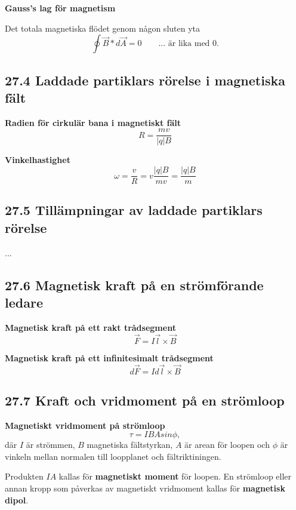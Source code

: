 \documentclass[a4paper]{article}
\begin{document}
\textbf{Gauss's lag för magnetism}

Det totala magnetiska flödet genom någon sluten yta 
\begin{equation}
\oint \vec{B}*d \vec{A} = 0 \qquad \text{... är lika med 0.}
\end{equation}

\subsection*{27.4 Laddade partiklars rörelse i magnetiska fält}
\textbf{Radien för cirkulär bana i magnetiskt fält}
\begin{equation}
R = \dfrac{mv}{|q|B}
\end{equation}

\textbf{Vinkelhastighet}
\begin{equation}
\omega = \dfrac{v}{R} = v \dfrac{|q|B}{mv} = \dfrac{|q|B}{m}
\end{equation}

\subsection*{27.5 Tillämpningar av laddade partiklars rörelse}
...

\subsection*{27.6 Magnetisk kraft på en strömförande ledare}
\textbf{Magnetisk kraft på ett rakt trådsegment}
\begin{equation}
\vec{F} = I \vec{l} \times \vec{B}
\end{equation}

\textbf{Magnetisk kraft på ett infinitesimalt trådsegment}
\begin{equation}
d \vec{F} = I d \vec{l} \times \vec{B}
\end{equation}

\subsection*{27.7 Kraft och vridmoment på en strömloop}

\textbf{Magnetiskt vridmoment på strömloop}
\begin{equation}
\tau = IBAsin\phi,
\end{equation}
där $I$ är strömmen, $B$ magnetiska fältstyrkan, $A$ är arean för loopen och $\phi$ är vinkeln mellan normalen till loopplanet och fältriktiningen.

Produkten $IA$ kallas för \textbf{magnetiskt moment} för loopen. En strömloop eller annan kropp som påverkas av magnetiskt vridmoment kallas för \textbf{magnetisk dipol}.
\end{document}

